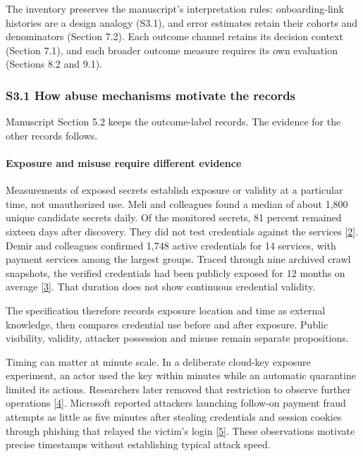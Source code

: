\documentclass[
  11pt,
]{article}
\begin{document}
The inventory preserves the manuscript's interpretation rules:
onboarding-link histories are a design analogy (S3.1), and error
estimates retain their cohorts and denominators (Section 7.2). Each
outcome channel retains its decision context (Section 7.1), and each
broader outcome measure requires its own evaluation (Sections 8.2 and
9.1).

\hypertarget{s3.1-how-abuse-mechanisms-motivate-the-records}{%
\subsubsection{S3.1 How abuse mechanisms motivate the
records}\label{s3.1-how-abuse-mechanisms-motivate-the-records}}

Manuscript Section 5.2 keeps the outcome-label records. The evidence for
the other records follows.

\hypertarget{exposure-and-misuse-require-different-evidence}{%
\paragraph{Exposure and misuse require different
evidence}\label{exposure-and-misuse-require-different-evidence}}

Measurements of exposed secrets establish exposure or validity at a
particular time, not unauthorized use. Meli and colleagues found a
median of about 1,800 unique candidate secrets daily. Of the monitored
secrets, 81 percent remained sixteen days after discovery. They did not
test credentials against the services
{[}\protect\hyperlink{ref-Meli2019}{2}{]}. Demir and colleagues
confirmed 1,748 active credentials for 14 services, with payment
services among the largest groups. Traced through nine archived crawl
snapshots, the verified credentials had been publicly exposed for 12
months on average {[}\protect\hyperlink{ref-Demir2026}{3}{]}. That
duration does not show continuous credential validity.

The specification therefore records exposure location and time as
external knowledge, then compares credential use before and after
exposure. Public visibility, validity, attacker possession and misuse
remain separate propositions.

Timing can matter at minute scale. In a deliberate cloud-key exposure
experiment, an actor used the key within minutes while an automatic
quarantine limited its actions. Researchers later removed that
restriction to observe further operations
{[}\protect\hyperlink{ref-Gamazo2023}{4}{]}. Microsoft reported
attackers launching follow-on payment fraud attempts as little as five
minutes after stealing credentials and session cookies through phishing
that relayed the victim's login
{[}\protect\hyperlink{ref-Microsoft2022AiTM}{5}{]}. These observations
motivate precise timestamps without establishing typical attack speed.
\end{document}
